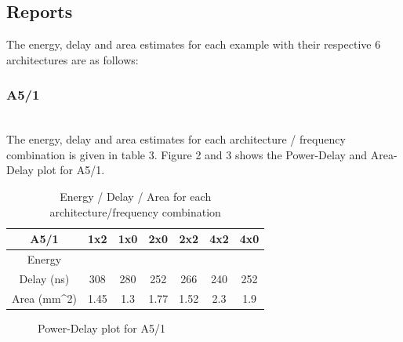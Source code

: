 \documentclass[a4paper, twoside]{article}      %
\begin{document}
\subsection{Reports}
The energy, delay and area estimates for each example with their respective 6 architectures are as follows:

\subsubsection{A5/1}
\\
The energy, delay and area estimates for each architecture / frequency combination is given in table 3.
Figure 2 and 3 shows the Power-Delay and Area-Delay plot for A5/1. 
\begin{table}[h!]
\caption{Energy / Delay / Area for each architecture/frequency combination}
\begin{center}
{\begin{tabular}{|c | c |  c |  c  | c  |  c |  c|}
\hline
A5/1 &1x2 &1x0 &2x0 &2x2 &4x2 &4x0 \\ [1ex]
\hline
Energy &&&&&& \\ [1ex]
\hline
Delay (ns)& 308& 280& 252& 266& 240& 252\\[1ex] \hline
Area (mm^2)& 1.45& 1.3& 1.77& 1.52& 2.3& 1.9\\[1ex]
\hline

\end{tabular}}
\label{diffstruc}
\end{center}
\end{table}


\begin{figure}[h!]
{\centering {} \par}
\caption{Power-Delay plot for A5/1}
\end{figure}
\end{document}
